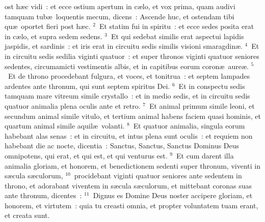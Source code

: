 \bchapter
{}ost h\ae c vidi~: et ecce ostium apertum in c\ae lo, et vox prima, quam audivi tamquam tub\ae\ loquentis mecum, dicens~: Ascende huc, et ostendam tibi qu\ae\ oportet fieri post h\ae c.
${}^{2}$~Et statim fui in spiritu~: et ecce sedes posita erat in c\ae lo, et supra sedem sedens.
${}^{3}$~Et qui sedebat similis erat aspectui lapidis jaspidis, et sardinis~: et iris erat in circuitu sedis similis visioni smaragdin\ae .
${}^{4}$~Et in circuitu sedis sedilia viginti quatuor~: et super thronos viginti quatuor seniores sedentes, circumamicti vestimentis albis, et in capitibus eorum coron\ae\ aure\ae .
${}^{5}$~Et de throno procedebant fulgura, et voces, et tonitrua~: et septem lampades ardentes ante thronum, qui sunt septem spiritus Dei.
${}^{6}$~Et in conspectu sedis tamquam mare vitreum simile crystallo~: et in medio sedis, et in circuitu sedis quatuor animalia plena oculis ante et retro.
${}^{7}$~Et animal primum simile leoni, et secundum animal simile vitulo, et tertium animal habens faciem quasi hominis, et quartum animal simile aquil\ae\ volanti.
${}^{8}$~Et quatuor animalia, singula eorum habebant alas senas~: et in circuitu, et intus plena sunt oculis~: et requiem non habebant die ac nocte, dicentia~: Sanctus, Sanctus, Sanctus Dominus Deus omnipotens, qui erat, et qui est, et qui venturus est.
${}^{9}$~Et cum darent illa animalia gloriam, et honorem, et benedictionem sedenti super thronum, viventi in s\ae cula s\ae culorum,
${}^{10}$~procidebant viginti quatuor seniores ante sedentem in throno, et adorabant viventem in s\ae cula s\ae culorum, et mittebant coronas suas ante thronum, dicentes~:
${}^{11}$~Dignus es Domine Deus noster accipere gloriam, et honorem, et virtutem~: quia tu creasti omnia, et propter voluntatem tuam erant, et creata sunt.

